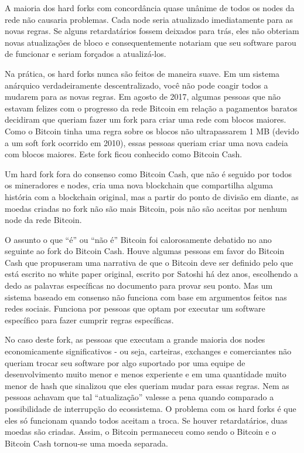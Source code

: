 A maioria dos hard forks com concordância quase unânime de todos os nodes da rede não causaria problemas. Cada node seria atualizado imediatamente para as novas regras. Se alguns retardatários fossem deixados para trás, eles não obteriam novas atualizações de bloco e consequentemente notariam que seu software parou de funcionar e seriam forçados a atualizá-los.

Na prática, os hard forks nunca são feitos de maneira suave. Em um sistema anárquico verdadeiramente descentralizado, você não pode coagir todos a mudarem para as novas regras. Em agosto de 2017, algumas pessoas que não estavam felizes com o progresso da rede Bitcoin em relação a pagamentos baratos decidiram que queriam fazer um fork para criar uma rede com blocos maiores. Como o Bitcoin tinha uma regra sobre os blocos não ultrapassarem 1 MB (devido a um soft fork ocorrido em 2010), essas pessoas queriam criar uma nova cadeia com blocos maiores. Este fork ficou conhecido como Bitcoin Cash.

Um hard fork fora do consenso como Bitcoin Cash, que não é seguido por todos os mineradores e nodes, cria uma nova blockchain que compartilha alguma história com a blockchain original, mas a partir do ponto de divisão em diante, as moedas criadas no fork não são mais Bitcoin, pois não são aceitas por nenhum node da rede Bitcoin.

O assunto o que “é” ou “não é” Bitcoin foi calorosamente debatido no ano seguinte ao fork do Bitcoin Cash. Houve algumas pessoas em favor do Bitcoin Cash que propuseram uma narrativa de que o Bitcoin deve ser definido pelo que está escrito no white paper original, escrito por Satoshi há dez anos, escolhendo a dedo as palavras específicas no documento para provar seu ponto. Mas um sistema baseado em consenso não funciona com base em argumentos feitos nas redes sociais. Funciona por pessoas que optam por executar um software específico para fazer cumprir regras específicas.

No caso deste fork, as pessoas que executam a grande maioria dos nodes economicamente significativos - ou seja, carteiras, exchanges e comerciantes não queriam trocar seu software por algo suportado por uma equipe de desenvolvimento muito menor e menos experiente e em uma quantidade muito menor de hash que sinalizou que eles queriam mudar para essas regras. Nem as pessoas achavam que tal “atualização” valesse a pena quando comparado a possibilidade de interrupção do ecossistema. O problema com os hard forks é que eles só funcionam quando todos aceitam a troca. Se houver retardatários, duas moedas são criadas. Assim, o Bitcoin permaneceu como sendo o Bitcoin e o Bitcoin Cash tornou-se uma moeda separada.

